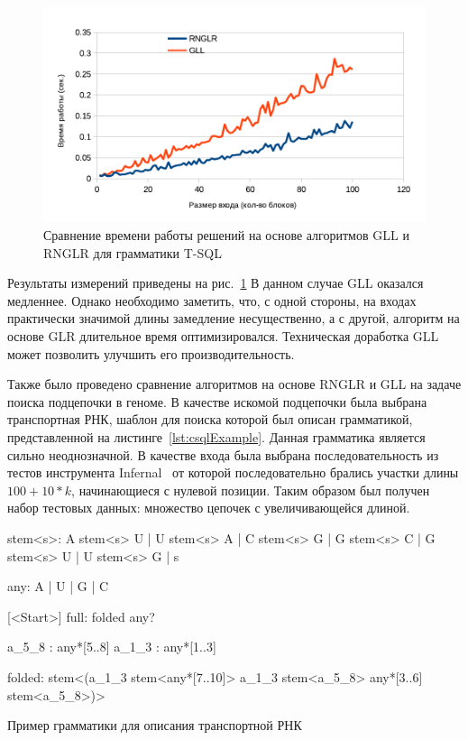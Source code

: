 \begin{figure}
 \centering
 \includegraphics[width=\textwidth]{Ragozina/pics/SQL.pdf}
 \caption{Сравнение времени работы решений на основе алгоритмов GLL и RNGLR для грамматики T-SQL}
 \label{exp3}
\end{figure}

Результаты измерений приведены на рис.~\ref{exp3} В данном случае GLL оказался медленнее. Однако необходимо заметить, что, с одной стороны, на входах практически значимой длины замедление несущественно, а с другой, алгоритм на основе GLR длительное время оптимизировался. Техническая доработка GLL может позволить улучшить его производительность.

Также было проведено сравнение алгоритмов на основе RNGLR и GLL на задаче поиска подцепочки в геноме. В качестве искомой подцепочки была выбрана транспортная РНК, шаблон для поиска которой был описан грамматикой, представленной на листинге~\ref{lst:csqlExample}. Данная грамматика является сильно неоднозначной. В качестве входа была выбрана последовательность из тестов инструмента Infernal~\cite{Infernal} от которой последовательно брались участки длины $100 + 10*k$, начинающиеся с нулевой позиции. Таким образом был получен набор тестовых данных: множество цепочек с увеличивающейся длиной.

\begin{listing}
    \begin{pyglist}[language=ocaml,numbers=left,numbersep=5pt]

stem<s>: 
      A stem<s> U
    | U stem<s> A
    | C stem<s> G
    | G stem<s> C
    | G stem<s> U
    | U stem<s> G
    | s

any: A | U | G | C

[<Start>]
full: folded any?

a_5_8 : any*[5..8]
a_1_3 : any*[1..3]

folded: stem<(a_1_3 stem<any*[7..10]> 
              a_1_3 stem<a_5_8> 
              any*[3..6] 
              stem<a_5_8>)> 

\end{pyglist}
\caption{Пример грамматики для описания транспортной РНК}
\label{lst:csqlExample}
\end{listing}

